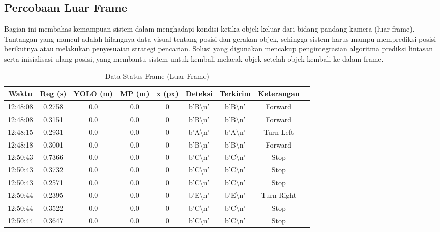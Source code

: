 \newpage
\subsection{Percobaan Luar Frame}
\label{subsec:percobaanluarframe}

Bagian ini membahas kemampuan sistem dalam menghadapi kondisi ketika objek keluar dari bidang pandang kamera (luar frame). Tantangan yang muncul adalah hilangnya data visual tentang posisi dan gerakan objek, sehingga sistem harus mampu memprediksi posisi berikutnya atau melakukan penyesuaian strategi pencarian. Solusi yang digunakan mencakup pengintegrasian algoritma prediksi lintasan serta inisialisasi ulang posisi, yang membantu sistem untuk kembali melacak objek setelah objek kembali ke dalam frame.

\begin{table}[H]
    \centering
    \caption{Data Status Frame (Luar Frame)}
    \label{tab:status_luar_frame}
    \begin{tabular}{|c|c|c|c|c|c|c|c|c|}
    \hline
    Waktu & Reg (s) & YOLO (m) & MP (m) & x (px) & Deteksi & Terkirim & Keterangan \\ \hline
    12:48:08 & 0.2758 & 0.0 & 0.0 & 0 & b'B\textbackslash n' & b'B\textbackslash n' & Forward \\ \hline
    12:48:08 & 0.3151 & 0.0 & 0.0 & 0 & b'B\textbackslash n' & b'B\textbackslash n' & Forward \\ \hline
    12:48:15 & 0.2931 & 0.0 & 0.0 & 0 & b'A\textbackslash n' & b'A\textbackslash n' & Turn Left \\ \hline
    12:48:18 & 0.3001 & 0.0 & 0.0 & 0 & b'B\textbackslash n' & b'B\textbackslash n' & Forward \\ \hline
    12:50:43 & 0.7366 & 0.0 & 0.0 & 0 & b'C\textbackslash n' & b'C\textbackslash n' & Stop \\ \hline
    12:50:43 & 0.3732 & 0.0 & 0.0 & 0 & b'C\textbackslash n' & b'C\textbackslash n' & Stop \\ \hline
    12:50:43 & 0.2571 & 0.0 & 0.0 & 0 & b'C\textbackslash n' & b'C\textbackslash n' & Stop \\ \hline
    12:50:44 & 0.2395 & 0.0 & 0.0 & 0 & b'E\textbackslash n' & b'E\textbackslash n' & Turn Right \\ \hline
    12:50:44 & 0.3522 & 0.0 & 0.0 & 0 & b'C\textbackslash n' & b'C\textbackslash n' & Stop \\ \hline
    12:50:44 & 0.3647 & 0.0 & 0.0 & 0 & b'C\textbackslash n' & b'C\textbackslash n' & Stop \\ \hline

\end{tabular}
\end{table}

